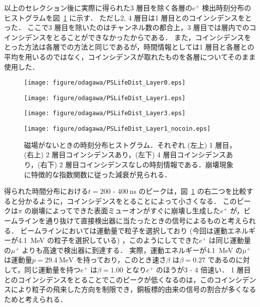 以上のセレクション後に実際に得られた3 層目を除く各層の$e^{+}$ 検出時刻分布のヒストグラムを図~\ref{fig:PSLifeDist} に示す．
ただし2, 4 層目は1 層目とのコインシデンスをとった．
ここで3 層目を除いたのはチャンネル数の都合上，3 層目では層内でのコインシデンスをとることができなかったからである．
また，コインシデンスをとった方法は各層での方法と同じであるが，時間情報としては1 層目と各層との平均を用いるのではなく，コインシデンスが取れたものを各層についてそのまま使用した．
\begin{figure}[h]
	\centering
	\begin{minipage}{0.45\textwidth}
	\centering
	\texttt{[image: figure/odagawa/PSLifeDist\_Layer0.eps]}
	\end{minipage}
	\begin{minipage}{0.45\textwidth}
	\centering
	\texttt{[image: figure/odagawa/PSLifeDist\_Layer1.eps]}
	\end{minipage}
	\begin{minipage}{0.45\textwidth}
	\centering
	\texttt{[image: figure/odagawa/PSLifeDist\_Layer3.eps]}
	\end{minipage}
	\begin{minipage}{0.45\textwidth}
	\centering
	\texttt{[image: figure/odagawa/PSLifeDist\_Layer1\_nocoin.eps]}
	\end{minipage}
	\caption{磁場がないときの時刻分布ヒストグラム．それぞれ (左上) 1 層目，(右上) 2 層目コインシデンスあり，(左下) 4 層目コインシデンスあり，(右下) 2 層目コインシデンスなしの時刻情報である．崩壊現象に特徴的な指数関数に従った減衰が見られる．}
	\label{fig:PSLifeDist}
\end{figure}%

得られた時間分布における$t = 200$ - $400~\mathrm{ns}$ のピークは，図~\ref{fig:PSLifeDist} の右二つを比較すると分かるように，コインシデンスをとることによって小さくなる．
このピークは$\pi$ の崩壊によってできた表面ミューオンがすぐに崩壊し生成した$e^{+}$ が，ビームラインを通り抜けて直接検出器に当たったときの信号によるものと考えられる．
ビームラインにおいては運動量で粒子を選択しており (今回は運動エネルギーが4.1~MeV の粒子を選択している) ，このようにしてできた$e^{+}$ は同じ運動量の$\mu^{+}$ よりも高速で検出器に到達する．
実際，運動エネルギーが4.1~MeV の$\mu^{+}$ は運動量$p = 29.4~\mathrm{MeV}$ を持っており，このとき速さ$\beta$ は$\beta = 0.27$ であるのに対して，同じ運動量を持つ$e^{+}$ は$\beta = 1.00$ となり$e^{+}$ のほうが3 - 4 倍速い．
1 層目とのコインシデンスをとることでこのピークが低くなるのは，このコインシデンスにより粒子の飛来した方向を制限でき，銅板標的由来の信号の割合が多くなるためと考えられる．

